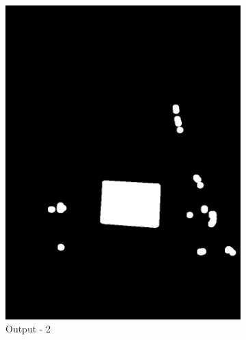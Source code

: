 \documentclass[paper=a4, fontsize=10pt]{scrartcl} %
\numberwithin{equation}{section} %
\numberwithin{figure}{section} %
\begin{document}
\begin{figure}[!ht]
\begin{subfigure}[b]{0.275\textwidth}
		\includegraphics[width=\textwidth]{s_dilation_02}
		\caption{Output - 2}
		\label{fig:s_dilation_output_02}
	\end{subfigure}
	~ 
	\begin{subfigure}[b]{0.275\textwidth}

\end{subfigure}
\end{figure}
\end{document}
